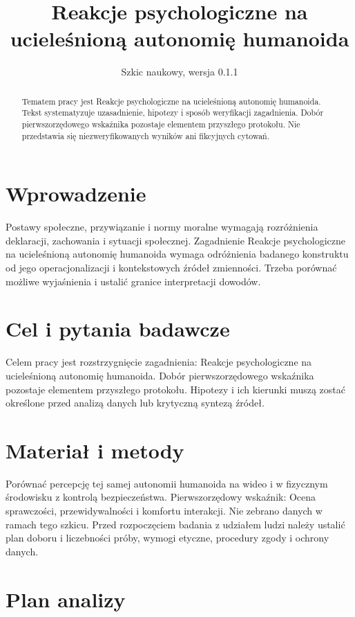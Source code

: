 \documentclass[11pt,a4paper]{article}
\title{Reakcje psychologiczne na ucieleśnioną autonomię humanoida}
\author{}
\date{Szkic naukowy, wersja 0.1.1}
\begin{document}
\maketitle

\begin{abstract}

Tematem pracy jest Reakcje psychologiczne na ucieleśnioną autonomię humanoida. Tekst systematyzuje uzasadnienie, hipotezy i sposób weryfikacji zagadnienia. Dobór pierwszorzędowego wskaźnika pozostaje elementem przyszłego protokołu. Nie przedstawia się niezweryfikowanych wyników ani fikcyjnych cytowań.

\end{abstract}

\section{Wprowadzenie}

Postawy społeczne, przywiązanie i normy moralne wymagają rozróżnienia deklaracji, zachowania i sytuacji społecznej. Zagadnienie Reakcje psychologiczne na ucieleśnioną autonomię humanoida wymaga odróżnienia badanego konstruktu od jego operacjonalizacji i kontekstowych źródeł zmienności. Trzeba porównać możliwe wyjaśnienia i ustalić granice interpretacji dowodów.

\section{Cel i pytania badawcze}

Celem pracy jest rozstrzygnięcie zagadnienia: Reakcje psychologiczne na ucieleśnioną autonomię humanoida. Dobór pierwszorzędowego wskaźnika pozostaje elementem przyszłego protokołu. Hipotezy i ich kierunki muszą zostać określone przed analizą danych lub krytyczną syntezą źródeł.

\section{Materiał i metody}

Porównać percepcję tej samej autonomii humanoida na wideo i w fizycznym środowisku z kontrolą bezpieczeństwa. Pierwszorzędowy wskaźnik: Ocena sprawczości, przewidywalności i komfortu interakcji. Nie zebrano danych w ramach tego szkicu. Przed rozpoczęciem badania z udziałem ludzi należy ustalić plan doboru i liczebności próby, wymogi etyczne, procedury zgody i ochrony danych.

\section{Plan analizy}
\end{document}
